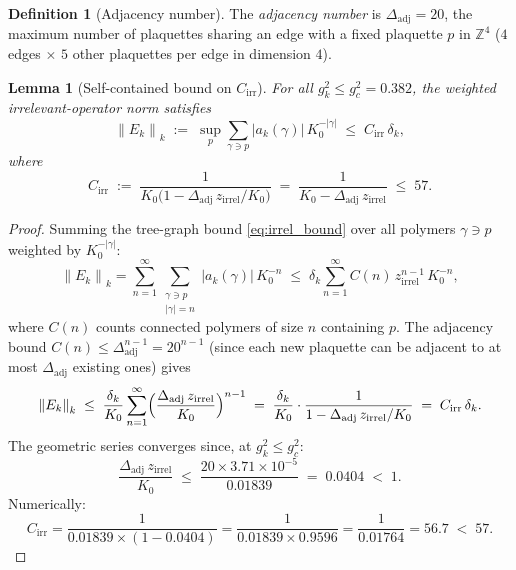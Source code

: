 \documentclass[11pt,a4paper]{amsart}
\newtheorem{lemma}[theorem]{Lemma}
\theoremstyle{definition}
\newtheorem{definition}[theorem]{Definition}
\newcommand{\Z}{\mathbb{Z}}
\newcommand{\norm}[1]{\left\|#1\right\|}
\newcommand{\gB}{g^2_c}
\begin{document}
\begin{definition}[Adjacency number]
The \emph{adjacency number} is $\Delta_{\mathrm{adj}} = 20$,
the maximum number of plaquettes sharing an edge with a fixed plaquette $p$
in $\Z^4$ ($4$ edges $\times$ $5$ other plaquettes per edge in dimension $4$).
\end{definition}

\begin{lemma}[Self-contained bound on $C_{\mathrm{irr}}$]
\label{lem:C_irr_bound}
For all $g^2_k \le \gB = 0.382$, the weighted irrelevant-operator norm satisfies
\begin{equation}
\label{eq:Cirr_formula}
  \norm{E_k}_k
  \;:=\; \sup_p \sum_{\gamma\ni p} |a_k(\gamma)|\,K_0^{-|\gamma|}
  \;\le\; C_{\mathrm{irr}}\,\delta_k,
\end{equation}
where
\begin{equation}
\label{eq:Cirr_def}
  C_{\mathrm{irr}}
  \;:=\; \frac{1}{K_0\bigl(1 - \Delta_{\mathrm{adj}}\,z_{\mathrm{irrel}}/K_0\bigr)}
  \;=\; \frac{1}{K_0 - \Delta_{\mathrm{adj}}\,z_{\mathrm{irrel}}}
  \;\le\; 57.
\end{equation}
\end{lemma}
\begin{proof}
Summing the tree-graph bound \eqref{eq:irrel_bound} over all polymers $\gamma\ni p$
weighted by $K_0^{-|\gamma|}$:
\[
  \norm{E_k}_k
  = \sum_{n=1}^\infty \sum_{\substack{\gamma\ni p\\|\gamma|=n}} |a_k(\gamma)|\,K_0^{-n}
  \;\le\; \delta_k \sum_{n=1}^\infty C(n)\,z_{\mathrm{irrel}}^{n-1}\,K_0^{-n},
\]
where $C(n)$ counts connected polymers of size $n$ containing $p$.
The adjacency bound $C(n) \le \Delta_{\mathrm{adj}}^{n-1} = 20^{n-1}$ (since each
new plaquette can be adjacent to at most $\Delta_{\mathrm{adj}}$ existing ones) gives
\[
  \norm{E_k}_k
  \;\le\; \frac{\delta_k}{K_0}
    \sum_{n=1}^\infty
    \Bigl(\frac{\Delta_{\mathrm{adj}}\,z_{\mathrm{irrel}}}{K_0}\Bigr)^{n-1}
  \;=\; \frac{\delta_k}{K_0}\cdot
    \frac{1}{1 - \Delta_{\mathrm{adj}}\,z_{\mathrm{irrel}}/K_0}
  \;=\; C_{\mathrm{irr}}\,\delta_k.
\]
The geometric series converges since, at $g^2_k \le \gB$:
\[
  \frac{\Delta_{\mathrm{adj}}\,z_{\mathrm{irrel}}}{K_0}
  \;\le\; \frac{20\times 3.71\times 10^{-5}}{0.01839}
  \;=\; 0.0404 \;<\; 1.
\]
Numerically:
\[
  C_{\mathrm{irr}}
  = \frac{1}{0.01839\times (1 - 0.0404)}
  = \frac{1}{0.01839\times 0.9596}
  = \frac{1}{0.01764}
  = 56.7 \;<\; 57.
\]
\end{proof}
\end{document}
